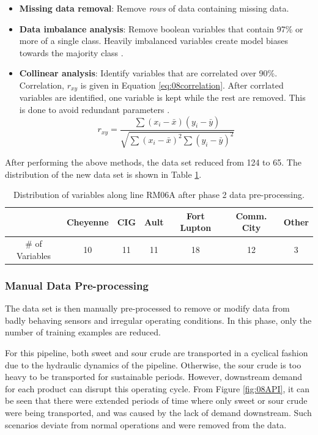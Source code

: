 \begin{itemize}
    \item \textbf{Missing data removal}: Remove \textit{rows} of data containing missing data.
    \item \textbf{Data imbalance analysis}: Remove boolean variables that contain 97\% or more of a single class.  Heavily imbalanced variables create model biases towards the majority class \cite{data_preprocessing}.
    \item \textbf{Collinear analysis}: Identify variables that are correlated over 90\%. Correlation, $r_{xy}$ is given in Equation \ref{eq:08correlation}. After corrlated variables are identified, one variable is kept while the rest are removed.  This is done to avoid redundant parameters \cite{data_preprocessing}.
    \begin{equation}
        r_{xy} = \frac{\sum(x_i - \bar{x})(y_i - \bar{y})}{\sqrt{\sum(x_i - \bar{x})^2\sum(y_i-\bar{y})^2}}
        \label{eq:08correlation}
    \end{equation}
    
\end{itemize}

After performing the above methods, the data set reduced from 124 to 65. The distribution of the new data set is shown in Table \ref{tab:08Ph2Data}.
\begin{table}[h]
    \centering
    {
    \begin{tabular}{ c | c | c | c | c | c | c}
             &  Cheyenne & CIG & Ault & Fort Lupton & Comm. City & Other      \\
        \hline
        \# of Variables  &  10  &  11  &  11  &  18  &  12  &  3  \\
    \end{tabular}}
    \caption{Distribution of variables along line RM06A after phase 2 data pre-processing.}
    \label{tab:08Ph2Data}
\end{table}

\subsubsection{Manual Data Pre-processing}
The data set is then manually pre-processed to remove or modify data from badly behaving sensors and irregular operating conditions.  In this phase, only the number of training examples are reduced.

For this pipeline, both sweet and sour crude are transported in a cyclical fashion due to the hydraulic dynamics of the pipeline. Otherwise, the sour crude is too heavy to be transported for sustainable periods. However, downstream demand for each product can disrupt this operating cycle.  From Figure \ref{fig:08API}, it can be seen that there were extended periods of time where only sweet or sour crude were being transported, and was caused by the lack of demand downstream.  Such scenarios deviate from normal operations and were removed from the data.

